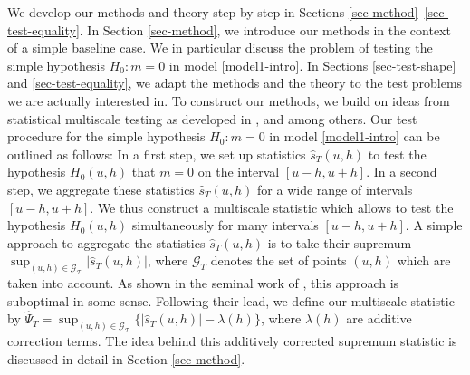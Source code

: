 We develop our methods and theory step by step in Sections \ref{sec-method}--\ref{sec-test-equality}. In Section \ref{sec-method}, we introduce our methods in the context of a simple baseline case. We in particular discuss the problem of testing the simple hypothesis $H_0: m = 0$ in model \eqref{model1-intro}. In Sections \ref{sec-test-shape} and \ref{sec-test-equality}, we adapt the methods and the theory to the test problems we are actually interested in. To construct our methods, we build on ideas from statistical multiscale testing as developed in \cite{ChaudhuriMarron1999,ChaudhuriMarron2000}, \cite{HallHeckman2000} and \cite{DuembgenSpokoiny2001} among others. Our test procedure for the simple hypothesis $H_0: m = 0$ in model \eqref{model1-intro} can be outlined as follows: In a first step, we set up statistics $\widehat{s}_T(u,h)$ to test the hypothesis $H_0(u,h)$ that $m = 0$ on the interval $[u-h,u+h]$. In a second step, we aggregate these statistics $\widehat{s}_T(u,h)$ for a wide range of intervals $[u-h,u+h]$. We thus construct a multiscale statistic which allows to test the hypothesis $H_0(u,h)$ simultaneously for many intervals $[u-h,u+h]$. A simple approach to aggregate the statistics $\widehat{s}_T(u,h)$ is to take their supremum $\sup_{(u,h) \in \mathcal{G_T}} |\widehat{s}_T(u,h)|$, where $\mathcal{G}_T$ denotes the set of points $(u,h)$ which are taken into account. As shown in the seminal work of \cite{DuembgenSpokoiny2001}, this approach is suboptimal in some sense. Following their lead, we define our multiscale statistic by $\widehat{\Psi}_T = \sup_{(u,h) \in \mathcal{G_T}} \{ |\widehat{s}_T(u,h)| - \lambda(h)\}$, where $\lambda(h)$ are additive correction terms. The idea behind this additively corrected supremum statistic is discussed in detail in Section \ref{sec-method}. 


